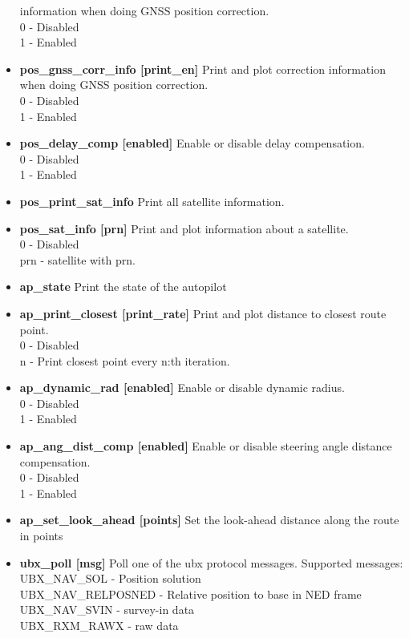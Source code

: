 \documentclass[12pt]{article} %
\begin{document}
\begin{itemize}
  information when doing GNSS position correction. \\
  0 - Disabled \\
  1 - Enabled
\item {\bf pos\_gnss\_corr\_info [print\_en]} Print and plot
  correction information when doing GNSS position correction. \\
   0 - Disabled \\
   1 - Enabled
\item {\bf pos\_delay\_comp [enabled]} Enable or disable delay
  compensation. \\
   0 - Disabled \\
   1 - Enabled
\item {\bf pos\_print\_sat\_info} Print all satellite information.
\item {\bf pos\_sat\_info [prn]} Print and plot information about a satellite. \\
   0 - Disabled \\
   prn - satellite with prn.
\item {\bf ap\_state} Print the state of the autopilot
\item {\bf ap\_print\_closest [print\_rate]} Print and plot distance to closest route point. \\
   0 - Disabled \\
   n - Print closest point every n:th iteration.
\item {\bf ap\_dynamic\_rad [enabled]} Enable or disable dynamic radius. \\
   0 - Disabled \\
   1 - Enabled
\item {\bf ap\_ang\_dist\_comp [enabled]} Enable or disable steering
  angle distance compensation. \\
   0 - Disabled \\
   1 - Enabled
\item {\bf ap\_set\_look\_ahead [points]} Set the look-ahead distance
  along the route in points
\item {\bf ubx\_poll [msg]}  Poll one of the ubx protocol messages. Supported messages: \\
 UBX\_NAV\_SOL - Position solution \\
 UBX\_NAV\_RELPOSNED - Relative position to base in NED frame\\ 
 UBX\_NAV\_SVIN - survey-in data \\
 UBX\_RXM\_RAWX - raw data\\
 \end{itemize} 
\end{document}
